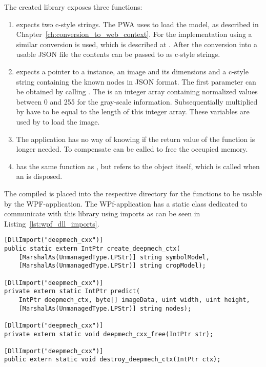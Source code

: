The created library exposes three functions:
\begin{enumerate}
    \item {} expects two c-style strings.
        The PWA uses  to load the model, as described in Chapter~\ref{ch:conversion_to_web_context}.
        For the implementation using  a similar conversion is used, which is described at .
        After the conversion into a usable JSON file the contents can be passed to  as c-style strings.
    \item {} expects a pointer to a  instance, an image and its dimensions and a c-style string containing the known nodes in JSON format.
        The first parameter can be obtained by calling .
        The  is an integer array containing normalized values between 0 and 255 for the gray-scale information.
        Subsequentially  multiplied by  have to be equal to the length of this integer array. These variables are used by  to load the image.
    \item The application has no way of knowing if the return value of the  function is longer needed.
        To compensate  can be called to free the occupied memory.
    \item {} has the same function as , but refers to the  object itself, which is called when an  is disposed.
\end{enumerate}

The compiled  is placed into the respective directory for the functions to be usable by the WPF-application.
The WPf-application has a static class dedicated to communicate with this library using imports as can be seen in Listing~\ref{lst:wpf_dll_imports}.

\begin{lstlisting}[label={lst:wpf_dll_imports}, caption={DllImports in the static Deepmech\_cxx class}]
[DllImport("deepmech_cxx")]
public static extern IntPtr create_deepmech_ctx(
    [MarshalAs(UnmanagedType.LPStr)] string symbolModel,
    [MarshalAs(UnmanagedType.LPStr)] string cropModel);

[DllImport("deepmech_cxx")]
private extern static IntPtr predict(
    IntPtr deepmech_ctx, byte[] imageData, uint width, uint height,
    [MarshalAs(UnmanagedType.LPStr)] string nodes);

[DllImport("deepmech_cxx")]
private extern static void deepmech_cxx_free(IntPtr str);

[DllImport("deepmech_cxx")]
public extern static void destroy_deepmech_ctx(IntPtr ctx);
\end{lstlisting}

